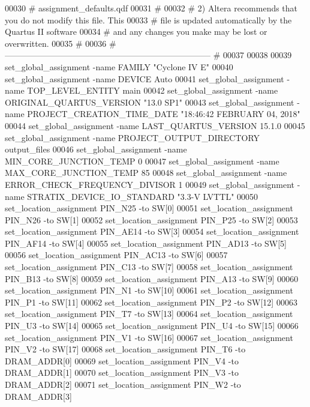 \begin{DoxyCode}
00030 \textcolor{keyword}{#       assignment\_defaults.qdf}
00031 \textcolor{keyword}{#}
00032 \textcolor{keyword}{# 2) Altera recommends that you do not modify this file. This}
00033 \textcolor{keyword}{#    file is updated automatically by the Quartus II software}
00034 \textcolor{keyword}{#    and any changes you make may be lost or overwritten.}
00035 \textcolor{keyword}{#}
00036 \textcolor{keyword}{# -------------------------------------------------------------------------- #}
00037 
00038 
00039 set\_global\_assignment -name FAMILY "Cyclone IV E"
00040 set\_global\_assignment -name DEVICE Auto
00041 set\_global\_assignment -name TOP\_LEVEL\_ENTITY main
00042 set\_global\_assignment -name ORIGINAL\_QUARTUS\_VERSION "13.\textcolor{vhdllogic}{0} SP1"
00043 set\_global\_assignment -name PROJECT\_CREATION\_TIME\_DATE "18:\textcolor{vhdllogic}{46}:\textcolor{vhdllogic}{42}  FEBRUARY \textcolor{vhdllogic}{04}, 2018"
00044 set\_global\_assignment -name LAST\_QUARTUS\_VERSION \textcolor{vhdllogic}{15}.\textcolor{vhdllogic}{1}.\textcolor{vhdllogic}{0}
00045 set\_global\_assignment -name PROJECT\_OUTPUT\_DIRECTORY output\_files
00046 set\_global\_assignment -name MIN\_CORE\_JUNCTION\_TEMP \textcolor{vhdllogic}{0}
00047 set\_global\_assignment -name MAX\_CORE\_JUNCTION\_TEMP \textcolor{vhdllogic}{85}
00048 set\_global\_assignment -name ERROR\_CHECK\_FREQUENCY\_DIVISOR \textcolor{vhdllogic}{1}
00049 set\_global\_assignment -name STRATIX\_DEVICE\_IO\_STANDARD "3.3-V LVTTL"
00050 set\_location\_assignment PIN\_N25 -to SW[0]
00051 set\_location\_assignment PIN\_N26 -to SW[1]
00052 set\_location\_assignment PIN\_P25 -to SW[2]
00053 set\_location\_assignment PIN\_AE14 -to SW[3]
00054 set\_location\_assignment PIN\_AF14 -to SW[4]
00055 set\_location\_assignment PIN\_AD13 -to SW[5]
00056 set\_location\_assignment PIN\_AC13 -to SW[6]
00057 set\_location\_assignment PIN\_C13 -to SW[7]
00058 set\_location\_assignment PIN\_B13 -to SW[8]
00059 set\_location\_assignment PIN\_A13 -to SW[9]
00060 set\_location\_assignment PIN\_N1 -to SW[10]
00061 set\_location\_assignment PIN\_P1 -to SW[11]
00062 set\_location\_assignment PIN\_P2 -to SW[12]
00063 set\_location\_assignment PIN\_T7 -to SW[13]
00064 set\_location\_assignment PIN\_U3 -to SW[14]
00065 set\_location\_assignment PIN\_U4 -to SW[15]
00066 set\_location\_assignment PIN\_V1 -to SW[16]
00067 set\_location\_assignment PIN\_V2 -to SW[17]
00068 set\_location\_assignment PIN\_T6 -to DRAM\_ADDR[0]
00069 set\_location\_assignment PIN\_V4 -to DRAM\_ADDR[1]
00070 set\_location\_assignment PIN\_V3 -to DRAM\_ADDR[2]
00071 set\_location\_assignment PIN\_W2 -to DRAM\_ADDR[3]

\end{DoxyCode}

